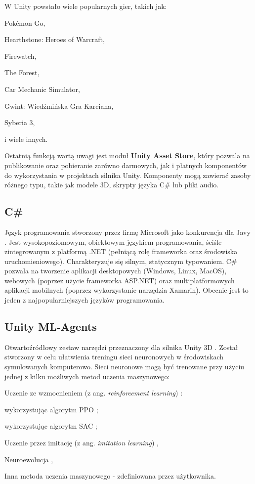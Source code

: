 W Unity powstało wiele popularnych gier, takich jak:
\begin{enumerate*}
\item Pokémon Go,
\item Hearthstone: Heroes of Warcraft,
\item Firewatch,
\item The Forest,
\item Car Mechanic Simulator,
\item Gwint: Wiedźmińska Gra Karciana,
\item Syberia 3,
\item i wiele innych.
\end{enumerate*}

Ostatnią funkcją wartą uwagi jest moduł \textbf{Unity Asset Store}, który pozwala na publikowanie oraz pobieranie zarówno darmowych, jak i płatnych komponentów do wykorzystania w projektach silnika Unity. Komponenty mogą zawierać zasoby różnego typu, takie jak modele 3D, skrypty języka C\# lub pliki audio.

\subsection{C\#}
Język programowania stworzony przez firmę Microsoft jako konkurencja dla Javy \cite{csharp:opis}. Jest wysokopoziomowym, obiektowym językiem programowania, ściśle zintegrowanym z platformą .NET (pełniącą rolę frameworka oraz środowiska uruchomieniowego). Charakteryzuje się silnym, statycznym typowaniem. C\# pozwala na tworzenie aplikacji desktopowych (Windows, Linux, MacOS), webowych (poprzez użycie frameworka ASP.NET) oraz multiplatformowych aplikacji mobilnych (poprzez wykorzystanie narzędzia Xamarin). Obecnie jest to jeden z najpopularniejszych języków programowania.

\subsection{Unity ML-Agents}
\label{UnityMlSection}
Otwartoźródłowy zestaw narzędzi przeznaczony dla silnika Unity 3D \cite{unitymla:overview}. Został stworzony w celu ułatwienia treningu sieci neuronowych w środowiskach symulowanych komputerowo. Sieci neuronowe mogą być trenowane przy użyciu jednej z kilku możliwych metod uczenia maszynowego:
\begin{enumerate*}
\item Uczenie ze wzmocnieniem (z ang. \textit{reinforcement learning}) \cite{deepRL:guide}:
\begin{itemize*}
\item wykorzystując algorytm PPO \cite{ppo:opis};
\item wykorzystując algorytm SAC \cite{sac:opis};
\end{itemize*}
\item Uczenie przez imitację (z ang. \textit{imitation learning}) \cite{imitationLearning:article},
\item Neuroewolucja \cite{neuroevolution:primer},
\item Inna metoda uczenia maszynowego - zdefiniowana przez użytkownika.
\end{enumerate*}

